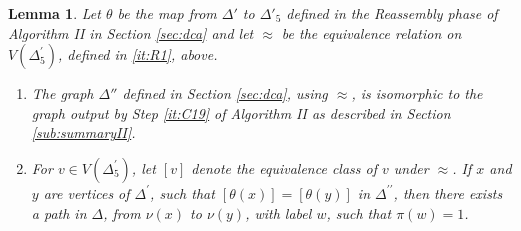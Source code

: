 \documentclass[a4paper,12pt]{article}
\newcommand{\D}{\Delta }
\newtheorem{lemma}[theorem]{Lemma}
\numberwithin{equation}{section}
\numberwithin{figure}{section}
\newcommand{\be}{\begin{enumerate}}
\newcommand{\ee}{\end{enumerate}}
\begin{document}
\begin{lemma}\label{lem:idverts}
Let $\theta$ be the map from $\D'$ to $\D'_5$ defined in the Reassembly
phase of Algorithm II in Section \ref{sec:dca} and 
let $\approx$ be the equivalence relation on $V(\D^\prime_5)$, defined 
in \ref{it:R1}, above.
\be
\item
The graph $\D''$ defined in Section \ref{sec:dca}, 
using $\approx$, is isomorphic
to the graph output by  Step \ref{it:C19} of Algorithm II as described in
Section \ref{sub:summaryII}. 
\item
For $v\in V(\D^\prime_5)$, let $[v]$ denote the equivalence class of $v$ under $\approx$. 
If $x$ and $y$ are vertices of $\D^\prime$, such that
$[\theta(x)]= [\theta(y)]$ in $\D^{\prime\prime}$, then
there exists a path in $\D$, from $\nu(x)$ to $\nu(y)$, with label $w$,
such that $\pi(w)=1$.
\ee
\end{lemma}
\end{document}
